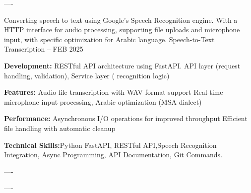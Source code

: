 \begin{cventries}
    \begin{singlespace}
----
\end{singlespace}

\cventry
    {Converting speech to text using Google's Speech Recognition engine. With a HTTP interface for audio processing, supporting file uploads and microphone input, with specific optimization for Arabic language.} %
    {Speech-to-Text Transcription} %
    {--} %
    {FEB 2025} %
    {
      \begin{cvitems} %
        \item \textbf{Development:}{ RESTful API architecture using FastAPI.
        API layer (request handling, validation), Service layer ( recognition logic)}
        \item \textbf{Features:}{ Audio file transcription with WAV format support
                Real-time microphone input processing, Arabic optimization (MSA dialect)}
        \item \textbf{Performance:}{ Asynchronous I/O operations for improved throughput Efficient file handling with automatic cleanup}
        \item \textbf{Technical Skills:}{Python FastAPI, RESTful API,Speech Recognition Integration, Async Programming, API Documentation, Git Commands.}
      \end{cvitems}
    }
    
    \begin{singlespace}
----
\end{singlespace}

    
    \begin{singlespace}
----
\end{singlespace}


\end{cventries}
